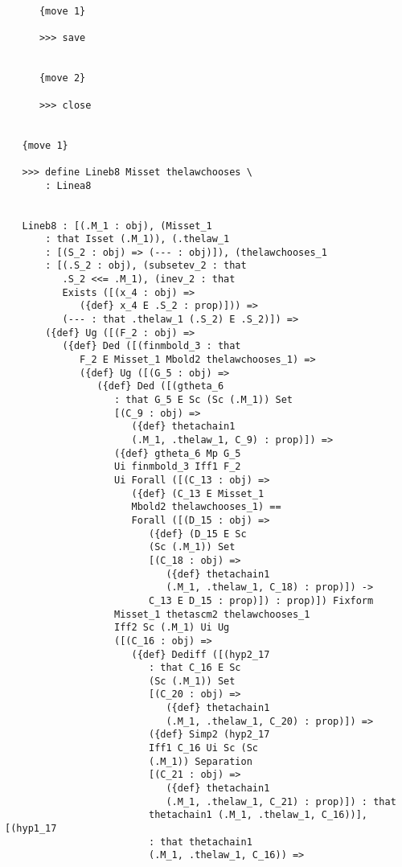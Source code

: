 \documentclass[12pt]{article}
\begin{document}
\begin{verbatim}
      {move 1}

      >>> save


      {move 2}

      >>> close


   {move 1}

   >>> define Lineb8 Misset thelawchooses \
       : Linea8


   Lineb8 : [(.M_1 : obj), (Misset_1 
       : that Isset (.M_1)), (.thelaw_1 
       : [(S_2 : obj) => (--- : obj)]), (thelawchooses_1 
       : [(.S_2 : obj), (subsetev_2 : that 
          .S_2 <<= .M_1), (inev_2 : that 
          Exists ([(x_4 : obj) => 
             ({def} x_4 E .S_2 : prop)])) => 
          (--- : that .thelaw_1 (.S_2) E .S_2)]) => 
       ({def} Ug ([(F_2 : obj) => 
          ({def} Ded ([(finmbold_3 : that 
             F_2 E Misset_1 Mbold2 thelawchooses_1) => 
             ({def} Ug ([(G_5 : obj) => 
                ({def} Ded ([(gtheta_6 
                   : that G_5 E Sc (Sc (.M_1)) Set 
                   [(C_9 : obj) => 
                      ({def} thetachain1 
                      (.M_1, .thelaw_1, C_9) : prop)]) => 
                   ({def} gtheta_6 Mp G_5 
                   Ui finmbold_3 Iff1 F_2 
                   Ui Forall ([(C_13 : obj) => 
                      ({def} (C_13 E Misset_1 
                      Mbold2 thelawchooses_1) == 
                      Forall ([(D_15 : obj) => 
                         ({def} (D_15 E Sc 
                         (Sc (.M_1)) Set 
                         [(C_18 : obj) => 
                            ({def} thetachain1 
                            (.M_1, .thelaw_1, C_18) : prop)]) -> 
                         C_13 E D_15 : prop)]) : prop)]) Fixform 
                   Misset_1 thetascm2 thelawchooses_1 
                   Iff2 Sc (.M_1) Ui Ug 
                   ([(C_16 : obj) => 
                      ({def} Dediff ([(hyp2_17 
                         : that C_16 E Sc 
                         (Sc (.M_1)) Set 
                         [(C_20 : obj) => 
                            ({def} thetachain1 
                            (.M_1, .thelaw_1, C_20) : prop)]) => 
                         ({def} Simp2 (hyp2_17 
                         Iff1 C_16 Ui Sc (Sc 
                         (.M_1)) Separation 
                         [(C_21 : obj) => 
                            ({def} thetachain1 
                            (.M_1, .thelaw_1, C_21) : prop)]) : that 
                         thetachain1 (.M_1, .thelaw_1, C_16))], [(hyp1_17 
                         : that thetachain1 
                         (.M_1, .thelaw_1, C_16)) => 

\end{verbatim}
\end{document}
